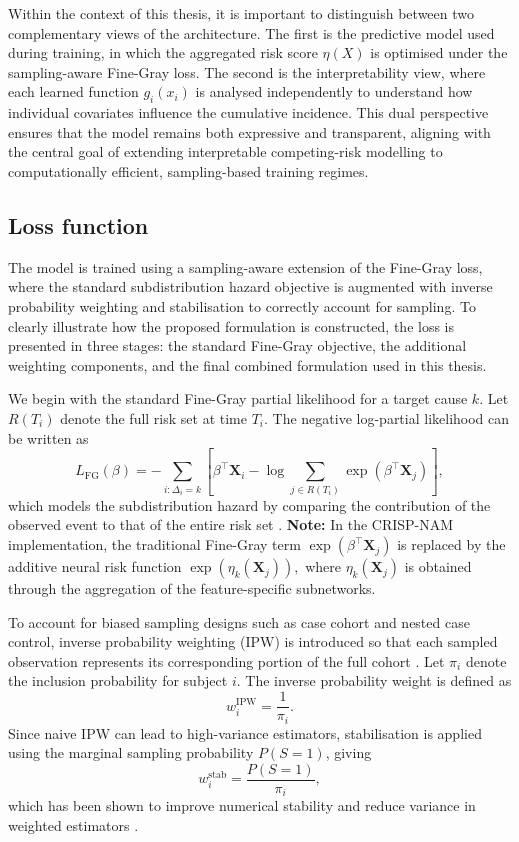 \documentclass[a4paper,twoside,12pt]{report}
\begin{document}
Within the context of this thesis, it is important to distinguish between two complementary views of the architecture. The first is the predictive model used during training, in which the aggregated risk score $\eta(X)$ is optimised under the sampling-aware Fine-Gray loss. The second is the interpretability view, where each learned function $g_i(x_i)$ is analysed independently to understand how individual covariates influence the cumulative incidence. This dual perspective ensures that the model remains both expressive and transparent, aligning with the central goal of extending interpretable competing-risk modelling to computationally efficient, sampling-based training regimes.

\subsection{Loss function}
The model is trained using a sampling-aware extension of the Fine-Gray loss, where the standard subdistribution hazard objective is augmented with inverse probability weighting and stabilisation to correctly account for sampling. To clearly illustrate how the proposed formulation is constructed, the loss is presented in three stages: the standard Fine-Gray objective, the additional weighting components, and the final combined formulation used in this thesis.

We begin with the standard Fine-Gray partial likelihood for a target cause $k$. Let $R(T_i)$ denote the full risk set at time $T_i$. The negative log-partial likelihood can be written as
\[
L_{\mathrm{FG}}(\beta)
=
-\sum_{i:\Delta_i = k}
\left[
\beta^\top \boldsymbol{X}_i
-
\log \sum_{j \in R(T_i)} \exp(\beta^\top \boldsymbol{X}_j)
\right],
\]
which models the subdistribution hazard by comparing the contribution of the observed event to that of the entire risk set \cite{FineGray1999}. \textbf{Note:} In the CRISP-NAM implementation, the traditional Fine-Gray term $\exp(\beta^\top \boldsymbol{X}_j)$ is replaced by the additive neural risk function $\exp(\eta_k(\boldsymbol{X}_j)),$ where \(\eta_k(\boldsymbol{X}_j)\) is obtained through the aggregation of the feature-specific subnetworks.

To account for biased sampling designs such as case cohort and nested case control, inverse probability weighting (IPW) is introduced so that each sampled observation represents its corresponding portion of the full cohort \cite{HorvitzThompson1952,Prentice1986}. Let $\pi_i$ denote the inclusion probability for subject $i$. The inverse probability weight is defined as
\[
w_i^{\mathrm{IPW}} = \frac{1}{\pi_i}.
\]
Since naive IPW can lead to high-variance estimators, stabilisation is applied using the marginal sampling probability $P(S=1)$, giving
\[
w_i^{\mathrm{stab}} = \frac{P(S=1)}{\pi_i},
\]
which has been shown to improve numerical stability and reduce variance in weighted estimators \cite{Robins2000,Hernan2000}.
\end{document}
